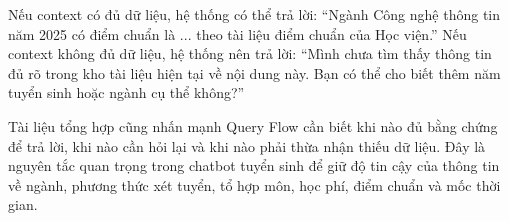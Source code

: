 Nếu context có đủ dữ liệu, hệ thống có thể trả lời: ``Ngành Công nghệ thông tin năm 2025 có điểm chuẩn là ... theo tài liệu điểm chuẩn của Học viện.'' Nếu context không đủ dữ liệu, hệ thống nên trả lời: ``Mình chưa tìm thấy thông tin đủ rõ trong kho tài liệu hiện tại về nội dung này. Bạn có thể cho biết thêm năm tuyển sinh hoặc ngành cụ thể không?''

Tài liệu tổng hợp cũng nhấn mạnh Query Flow cần biết khi nào đủ bằng chứng để trả lời, khi nào cần hỏi lại và khi nào phải thừa nhận thiếu dữ liệu. Đây là nguyên tắc quan trọng trong chatbot tuyển sinh để giữ độ tin cậy của thông tin về ngành, phương thức xét tuyển, tổ hợp môn, học phí, điểm chuẩn và mốc thời gian.
